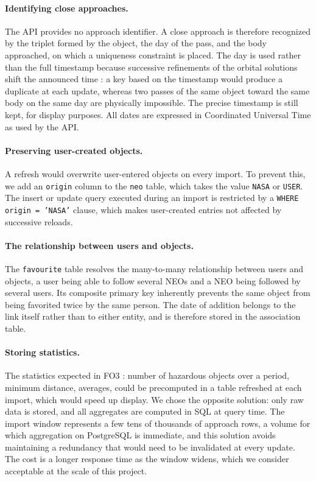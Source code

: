 \paragraph{Identifying close approaches.}
The API provides no approach identifier. A close approach is therefore
recognized by the triplet formed by the object, the day of the pass, and
the body approached, on which a uniqueness constraint is placed. The day
is used rather than the full timestamp because successive refinements of
the orbital solutions shift the announced time : a key
based on the timestamp would produce a duplicate at each update, whereas
two passes of the same object toward the same body on the same day are
physically impossible. The precise timestamp is still kept, for display
purposes. All dates are expressed in Coordinated Universal Time as used
by the API.

\paragraph{Preserving user-created objects.}
A refresh would overwrite user-entered objects on every import. To
prevent this, we add an \texttt{origin} column to the \texttt{neo}
table, which takes the value \texttt{NASA} or \texttt{USER}. The
insert or update query executed during an import is restricted by a
\texttt{WHERE origin = 'NASA'} clause, which makes user-created entries
not affected by successive reloads.

\paragraph{The relationship between users and objects.}
The \texttt{favourite} table resolves the many-to-many relationship between
users and objects, a user being able to follow several NEOs and a NEO
being followed by several users. Its composite primary key inherently
prevents the same object from being favorited twice by the same person.
The date of addition belongs to the link itself rather than to either entity,
and is therefore stored in the association table.

\paragraph{Storing statistics.}
The statistics expected in FO3 :  number of hazardous objects over a
period, minimum distance, averages, could be precomputed in a table
refreshed at each import, which would speed up display. We chose the
opposite solution: only raw data is stored, and all aggregates are
computed in SQL at query time. The import window represents a few tens
of thousands of approach rows, a volume for which aggregation on
PostgreSQL is immediate, and this solution avoids maintaining a
redundancy that would need to be invalidated at every update. The cost is
a longer response time as the window widens, which we consider
acceptable at the scale of this project.

